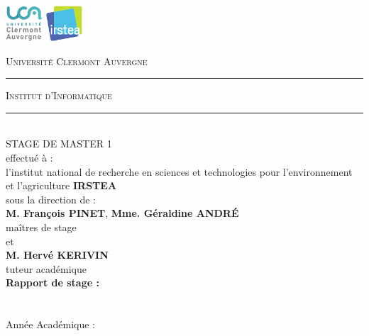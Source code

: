 \newenvironment{changemargin}[2]{\begin{list}{}{%
\setlength{\topsep}{0pt}%
\setlength{\leftmargin}{0pt}%
\setlength{\rightmargin}{0pt}%
\setlength{\listparindent}{\parindent}%
\setlength{\itemindent}{\parindent}%
\setlength{\parsep}{0pt plus 1pt}%
\addtolength{\leftmargin}{#1}%
\addtolength{\rightmargin}{#2}%
}\item }{\end{list}}
\begin{changemargin}{-2cm}{-2cm}
\newcommand{\HRule}{\rule[2mm]{10mm}{0.5mm}}
\thispagestyle{empty}
\includegraphics[height=50px]{images/Logo-UCA.png}
\hspace*{\fill}
\includegraphics[height=50px]{images/irstea_logo.png}
\begin{center}
    \textsc{\large Université Clermont Auvergne}\\[0.5mm]
    \HRule \textsc{ Institut d'Informatique} \HRule 
    \\[1cm]
    STAGE DE MASTER 1
    \\[1cm]
     effectué à : 
     \\
   l'institut national de recherche en sciences et technologies pour l'environnement et l'agriculture
   \textbf{IRSTEA}
   \\[0.5cm]
    sous la direction de : 
    \\[1cm]
    \textbf{M. François PINET}, \textbf{Mme. Géraldine ANDRÉ}
    \\
    maîtres de stage
    \\[0.5cm]
    et
    \\[0.5cm]
  \textbf{M. Hervé KERIVIN}
    \\
    tuteur académique
    \\[2cm]
    
    \textbf{\large{Rapport de stage : }}
    \\[.5cm]
    {\huge \Title}
    \\[2cm]

    \textbf{\Author}
    \\[0.5cm]

    Année Académique : \Date
\end{center}
\end{changemargin}

